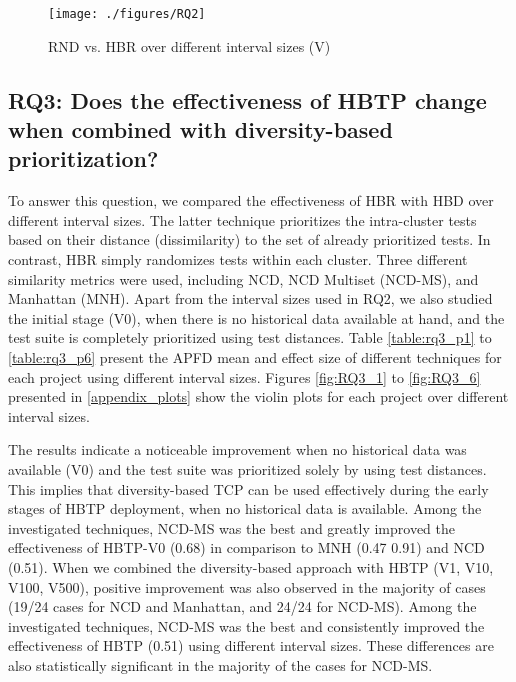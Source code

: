 \documentclass[1p]{elsarticle}
\begin{document}
\begin{figure}[h]
\centering
\texttt{[image: ./figures/RQ2]}
\caption{RND vs. HBR over different interval sizes (V)} \label{fig:rq2}
\end{figure}


\subsection{RQ3: Does the effectiveness of HBTP change when combined with diversity-based prioritization?}

To answer this question, we compared the effectiveness of HBR with HBD over different interval sizes. The latter technique prioritizes the intra-cluster tests based on their distance (dissimilarity) to the set of already prioritized tests. In contrast, HBR simply randomizes tests within each cluster. Three different similarity metrics were used, including NCD, NCD Multiset (NCD-MS), and Manhattan (MNH). Apart from the interval sizes used in RQ2, we also studied the initial stage (V0), when there is no historical data available at hand, and the test suite is completely prioritized using test distances. Table \ref{table:rq3_p1} to \ref{table:rq3_p6} present the APFD mean and effect size of different techniques for each project using different interval sizes. Figures \ref{fig:RQ3_1} to \ref{fig:RQ3_6} presented in \ref{appendix_plots} show the violin plots for each project over different interval sizes. 

The results indicate a noticeable improvement when no historical data was available (V0) and the test suite was prioritized solely by using test distances. This implies that diversity-based TCP can be used effectively during the early stages of HBTP deployment, when no historical data is available. Among the investigated techniques, NCD-MS was the best and greatly improved the effectiveness of HBTP-V0 (0.68) in comparison to MNH (0.47\textendash{} 0.91) and NCD (0.51). When we combined the diversity-based approach with HBTP (V1, V10, V100, V500), positive improvement was also observed in the majority of cases (19/24 cases for NCD and Manhattan, and 24/24 for NCD-MS). Among the investigated techniques, NCD-MS was the best and consistently improved the effectiveness of HBTP (0.51) using different interval sizes. These differences are also statistically significant in the majority of the cases for NCD-MS.
\end{document}

